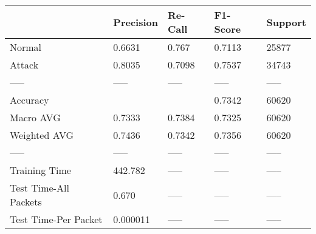 \begin{tabular}{lllll}
\toprule
{} & Precision & Re-Call & F1-Score & Support \\
\midrule
Normal                &    0.6631 &   0.767 &   0.7113 &   25877 \\
Attack                &    0.8035 &  0.7098 &   0.7537 &   34743 \\
-----                 &     ----- &   ----- &    ----- &   ----- \\
Accuracy              &           &         &   0.7342 &   60620 \\
Macro AVG             &    0.7333 &  0.7384 &   0.7325 &   60620 \\
Weighted AVG          &    0.7436 &  0.7342 &   0.7356 &   60620 \\
-----                 &     ----- &   ----- &    ----- &   ----- \\
Training Time         &   442.782 &   ----- &    ----- &   ----- \\
Test Time-All Packets &     0.670 &   ----- &    ----- &   ----- \\
Test Time-Per Packet  &  0.000011 &   ----- &    ----- &   ----- \\
\bottomrule
\end{tabular}
